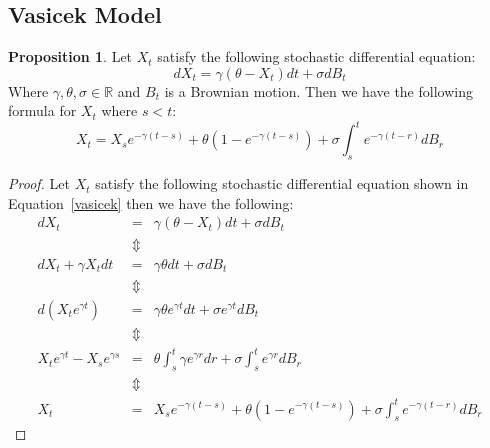 \documentclass[11pt]{article}
\theoremstyle{definition}
\newtheorem{prop}{Proposition}[section]
\newcommand{\brac}[1]{\left(#1\right)}
\newcommand{\R}{\mathbb{R}}
\begin{document}
\subsection{Vasicek Model}
	\begin{prop}
		Let $X_t$ satisfy the following stochastic differential equation:
		\begin{equation}\label{vasicek}
			dX_t = \gamma\brac{\theta - X_t}dt + \sigma dB_t
		\end{equation}
		Where $\gamma,\theta,\sigma\in\R$ and $B_t$ is a Brownian motion. Then we have the following formula for $X_t$ where $s<t$:
		\begin{equation}\label{vasicekSol}
			X_t = X_se^{-\gamma\brac{t-s}} + \theta\brac{1-e^{-\gamma\brac{t-s}}} + \sigma\int_{s}^{t}e^{-\gamma\brac{t-r}}dB_r
		\end{equation}
	\end{prop}
	\begin{proof}
		Let $X_t$ satisfy the following stochastic differential equation shown in Equation~\ref{vasicek} then we have the following:
		\begin{eqnarray*}
			dX_t &=& \gamma\brac{\theta - X_t}dt + \sigma dB_t\\
			&\Updownarrow&\\
			dX_t + \gamma X_t dt &=& \gamma\theta dt + \sigma dB_t\\
			&\Updownarrow&\\
			d\brac{X_t e^{\gamma t}} &=& \gamma\theta e^{\gamma t} dt + \sigma e^{\gamma t} dB_t\\
			&\Updownarrow& \\
			X_t e^{\gamma t} - X_s e^{\gamma s} &=& \theta\int_{s}^{t}\gamma e^{\gamma r}dr + \sigma\int_{s}^{t}e^{\gamma r}dB_r\\
			&\Updownarrow&\\
			X_t &=& X_se^{-\gamma\brac{t-s}} + \theta\brac{1-e^{-\gamma\brac{t-s}}} + \sigma\int_{s}^{t}e^{-\gamma\brac{t-r}}dB_r			
		\end{eqnarray*}
	\end{proof}
\end{document}
